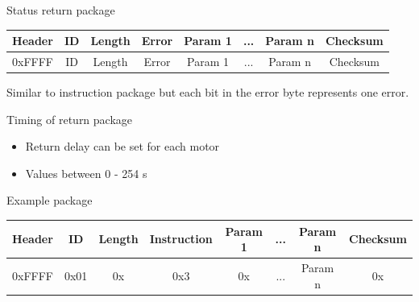 \documentclass{beamer}
\begin{document}
\begin{frame}{Status return package}

    \begin{table}
        \begin{flushleft}
            \begin{tabular}{| c | c | c | c | c | c | c | c |}
                \hline
                Header & ID & Length & Error & Param 1 & ... & Param n & Checksum\\
                \hline
                0xFFFF & ID & Length & Error & Param 1 & ... & Param n & Checksum\\
                \hline
            \end{tabular}
        \end{flushleft}
    \end{table}
    Similar to instruction package but each bit in the error byte represents one error.
    
\end{frame}



\begin{frame}{Timing of return package}

    \begin{itemize}
        \item Return delay can be set for each motor
        \item Values between 0 - 254 \(\)s
    \end{itemize}
    
\end{frame}



\begin{frame}{Example package}

    \begin{table}
        \begin{flushleft}
            \begin{tabular}{| c | c | c | c | c | c | c | c |}
                \hline
                Header & ID & Length & Instruction & Param 1 & ... & Param n & Checksum\\
                \hline
                0xFFFF & 0x01 & 0x & 0x3 & 0x & ... & Param n & 0x\\
                \hline
            \end{tabular}
        \end{flushleft}
    \end{table}
    
\end{frame}
\end{document}

